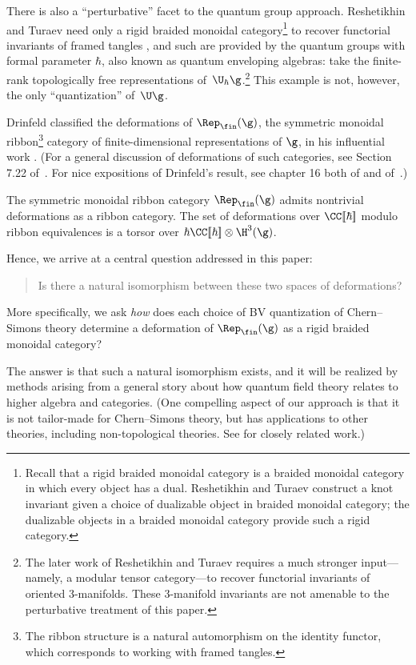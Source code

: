 \documentclass[10pt]{amsart}
\begin{document}
There is also a ``perturbative'' facet to the quantum group approach.
Reshetikhin and Turaev need only a rigid braided monoidal category\footnote{Recall that a rigid braided monoidal category is a braided monoidal category in which every object has a dual.  Reshetikhin and Turaev construct a knot invariant given a choice of dualizable object in braided monoidal category;
the dualizable objects in a braided monoidal category provide such a rigid category.}  to recover functorial invariants of framed tangles \cite{RT},
and such are provided by the quantum groups with formal parameter $\hbar$,
also known as quantum enveloping algebras:
take the finite-rank topologically free representations of~$\U_\hbar \g$.\footnote{The later work of Reshetikhin and Turaev \cite{RT3man} requires a much stronger input---namely, a modular tensor category---to recover functorial invariants of oriented 3-manifolds.
These 3-manifold invariants are not amenable to the perturbative treatment of this paper.} 
This example is not, however, the only ``quantization'' of~$\U\g$. 

Drinfeld classified the deformations of $\Rep_\fin(\g)$, the symmetric monoidal ribbon\footnote{The ribbon structure is a natural automorphism on the identity functor, which corresponds to working with framed tangles.} category of finite-dimensional representations of $\g$, in his influential work \cite{DriQHA,DriACHA,DriGal}. 
(For a general discussion of deformations of such categories, see Section 7.22 of~\cite{EGNO}. 
For nice expositions of Drinfeld's result, see chapter 16 both of \cite{ChaPre} and of~\cite{EtiSch}.)

\begin{thm}[Drinfeld]
The symmetric monoidal ribbon category $\Rep_\fin(\g)$ admits nontrivial deformations as a ribbon category.
The set of deformations over $\CC[\![\hbar]\!]$ modulo ribbon equivalences is a torsor over $\hbar\CC[\![\hbar]\!] \otimes \H^3(\g)$.
\end{thm}

Hence, we arrive at a central question addressed in this paper: 
\begin{quotation}
Is there a natural isomorphism between these two spaces of deformations?
\end{quotation}
More specifically, we ask {\em how} does each choice of BV quantization of Chern--Simons theory determine a deformation of $\Rep_\fin(\g)$ as a rigid braided monoidal category?

The answer is that such a natural isomorphism exists, 
and it will be realized by methods arising from a general story about how quantum field theory relates to higher algebra and categories.
(One compelling aspect of our approach is that it is not tailor-made for Chern--Simons theory,
but has applications to other theories, including non-topological theories.
See \cite{CosYang,CosSM,CWY} for closely related work.)
\end{document}
